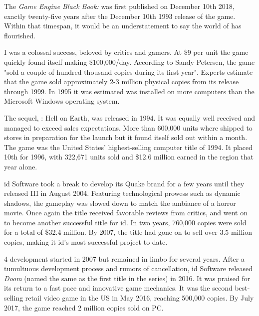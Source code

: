 The \textit{Game Engine Black Book: \doom{}} was first published on December 10th 2018, exactly twenty-five years after the December 10th 1993 release of the game. Within that timespan, it would be an understatement to say the world of \doom{} has flourished.\\
\par
\doom{} I was a colossal success, beloved by critics and gamers. At \$9 per unit the game quickly found itself making \$100,000/day. According to Sandy Petersen, the game "sold a couple of hundred thousand copies during its first year". Experts estimate that the game sold approximately 2-3 million physical copies from its release through 1999. In 1995 it was estimated \doom{} was installed on more computers than the Microsoft Windows operating system.\\
\par
The sequel, \doomii{}: Hell on Earth, was released in 1994. It was equally well received and managed to exceed sales expectations. More than 600,000 units where shipped to stores in preparation for the launch but it found itself sold out within a month. The game was the United States' highest-selling computer title of 1994. It placed 10th for 1996, with 322,671 units sold and \$12.6 million earned in the region that year alone.\\
\par
id Software took a break to develop its Quake brand for a few years until they released \doom{} III in August 2004. Featuring technological prowess such as dynamic shadows, the gameplay was slowed down to match the ambiance of a horror movie. Once again the title received favorable reviews from critics, and went on to become another successful title for id. In two years, 760,000 copies were sold for a total of \$32.4 million.  By 2007, the title had gone on to sell over 3.5 million copies, making it id's most successful project to date.\\
\par
 \doom{} 4 development started in 2007 but remained in limbo for several years. After a tumultuous development process and rumors of cancellation, id Software released \textit{Doom} (named the same as the first title in the series) in 2016. It was praised for its return to a fast pace and innovative game mechanics. It was the second best-selling retail video game in the US in May 2016, reaching 500,000 copies. By July 2017, the game reached 2 million copies sold on PC.\\
\par

